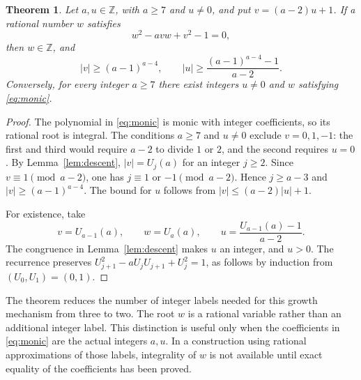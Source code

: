 \documentclass[11pt]{article}
\newtheorem{theorem}{Theorem}
\newcommand{\Z}{\mathbb Z}
\begin{document}
\begin{theorem}\label{thm:growth}
Let $a,u\in\Z$, with $a\ge7$ and $u\ne0$, and put
$v=(a-2)u+1$. If a rational number $w$ satisfies
\begin{equation}\label{eq:monic}
                      w^2-avw+v^2-1=0,
\end{equation}
then $w\in\Z$, and
\[
          |v|\ge(a-1)^{a-4},\qquad
          |u|\ge\frac{(a-1)^{a-4}-1}{a-2}.
\]
Conversely, for every integer $a\ge7$ there exist integers $u\ne0$
and $w$ satisfying \eqref{eq:monic}.
\end{theorem}
\begin{proof}
The polynomial in \eqref{eq:monic} is monic with integer
coefficients, so its rational root is integral. The conditions
$a\ge7$ and $u\ne0$ exclude $v=0,1,-1$: the first and third would
require $a-2$ to divide $1$ or $2$, and the second requires $u=0$.
By Lemma~\ref{lem:descent}, $|v|=U_j(a)$ for an integer $j\ge2$.
Since $v\equiv1\pmod{a-2}$, one has
$j\equiv1$ or $-1\pmod{a-2}$. Hence $j\ge a-3$ and
$|v|\ge(a-1)^{a-4}$. The bound for $u$ follows from
$|v|\le(a-2)|u|+1$.

For existence, take
\[
 v=U_{a-1}(a),\qquad w=U_a(a),\qquad
 u=\frac{U_{a-1}(a)-1}{a-2}.
\]
The congruence in Lemma~\ref{lem:descent} makes $u$ an integer,
and $u>0$. The recurrence preserves
$U_{j+1}^2-aU_jU_{j+1}+U_j^2=1$, as follows by induction from
$(U_0,U_1)=(0,1)$.
\end{proof}

The theorem reduces the number of integer labels needed for this
growth mechanism from three to two. The root $w$ is a rational
variable rather than an additional integer label. This distinction
is useful only when the coefficients in \eqref{eq:monic} are the
actual integers $a,u$. In a construction using rational
approximations of those labels, integrality of $w$ is not available
until exact equality of the coefficients has been proved.
\end{document}
